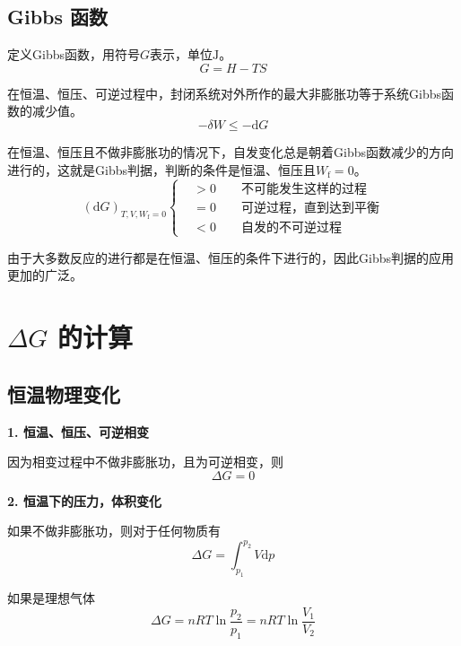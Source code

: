 \documentclass[lang=cn,newtx,10pt,scheme=chinese]{elegantbook}
\begin{document}
\subsection{Gibbs 函数}
定义Gibbs函数，用符号$G$表示，单位$\mathrm{J}$。
\begin{equation}
	G=H-TS
\end{equation}

在恒温、恒压、可逆过程中，封闭系统对外所作的最大非膨胀功等于系统Gibbs函数的减少值。
\begin{equation}
	-\delta W \leqslant -\mathrm{d}G
\end{equation}

在恒温、恒压且不做非膨胀功的情况下，自发变化总是朝着Gibbs函数减少的方向进行的，这就是Gibbs判据，判断的条件是恒温、恒压且$W_\mathrm{f}=0$。
\begin{equation}
	(\mathrm{d}G)_{T,V,W_\mathrm{f}=0} \left\{
	\begin{aligned}
		&> 0 \qquad \text{不可能发生这样的过程} \\
		&= 0 \qquad \text{可逆过程，直到达到平衡}\\
		&< 0 \qquad \text{自发的不可逆过程} 
	\end{aligned}
	\right.
\end{equation}

由于大多数反应的进行都是在恒温、恒压的条件下进行的，因此Gibbs判据的应用更加的广泛。

\section{$\Delta G$ 的计算}
\subsection{恒温物理变化}

\textbf{1. 恒温、恒压、可逆相变}

因为相变过程中不做非膨胀功，且为可逆相变，则
\begin{equation}
	\Delta G =0
\end{equation}

\textbf{2. 恒温下的压力，体积变化}

如果不做非膨胀功，则对于任何物质有
\begin{equation}
	\Delta G = \int_{p_1}^{p_2} V\mathrm{d}p
\end{equation}

如果是理想气体
\begin{equation}
	\Delta G = nRT\ln \frac{p_2}{p_1}=nRT\ln \frac{V_1}{V_2}
\end{equation}
\end{document}
